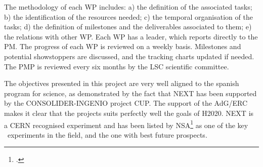 The methodology of each WP includes: a) the definition of the associated tasks; b) the identification of the resources needed; c) the temporal organisation of the tasks; d) the definition of milestones and the deliverables associated to them; e) the relations with other WP. Each WP has a leader, which reports directly to the PM. The progress of each WP is reviewed on a weekly basis. Milestones and potential showstoppers are discussed, and the tracking charts updated if needed. The PMP is reviewed every six months by the LSC scientific committee.  

The objectives presented in this project are very well aligned to the spanish program for science, as demonstrated by the fact that NEXT has been supported by the CONSOLIDER-INGENIO project CUP. The support of the AdG/ERC makes it clear that the projects suits perfectly well the goals of H2020. NEXT is a CERN recognised experiment and has been listed by NSA\footcite{NLDBD} as one of the key \bbonu\ experiments in the field, and the one with best future prospects.




